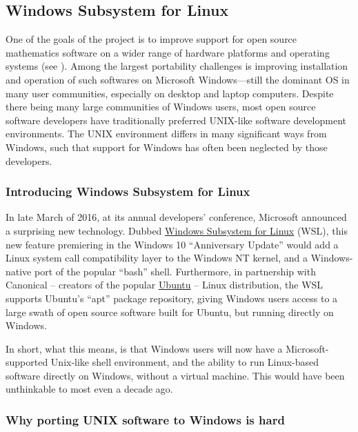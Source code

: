 \documentclass{deliverablereport}
\begin{document}
\subsection{Windows Subsystem for Linux}
\label{sec:winix}

One of the goals of the \ODK project is to improve support for open
source mathematics software on a wider range of hardware platforms and
operating systems (see ).
Among the largest portability challenges is improving installation and
operation of such softwares on Microsoft Windows---still the dominant
OS in many user communities, especially on desktop and laptop
computers.  Despite there being many large communities of Windows
users, most open source software developers have traditionally
preferred UNIX-like software development environments.  The UNIX
environment differs in many significant ways from Windows, such that
support for Windows has often been neglected by those developers.


\subsubsection{Introducing Windows Subsystem for Linux}

In late March of 2016, at its annual developers' conference, Microsoft
announced a surprising new technology.  Dubbed
\href{https://msdn.microsoft.com/commandline/wsl/about}{Windows
  Subsystem for Linux} (WSL), this new feature premiering in the
Windows 10 ``Anniversary Update'' would add a Linux system call
compatibility layer to the Windows NT kernel, and a Windows-native
port of the popular ``bash'' shell.  Furthermore, in partnership
with Canonical -- creators of the popular
\href{http://www.ubuntu.com/}{Ubuntu} -- Linux distribution, the WSL
supports Ubuntu's ``apt'' package repository, giving Windows users
access to a large swath of open source software built for Ubuntu, but
running directly on Windows.

In short, what this means, is that Windows users will now have a
Microsoft-supported Unix-like shell environment, and the ability to
run Linux-based software directly on Windows, without a virtual
machine.  This would have been unthinkable to most even a decade ago.


\subsubsection{Why porting UNIX software to Windows is hard}
\end{document}
